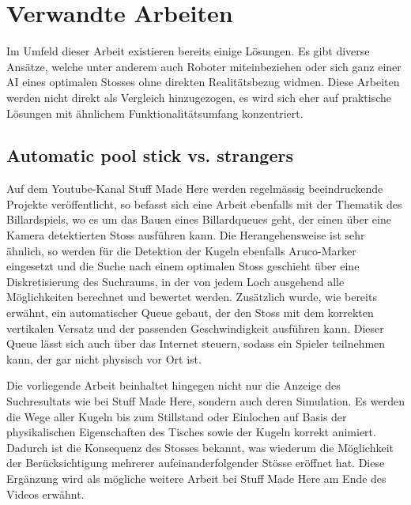 \section{Verwandte Arbeiten}\label{kap:verwandte_arbeiten}
Im Umfeld dieser Arbeit existieren bereits einige Lösungen. Es gibt diverse Ansätze, welche
unter anderem auch Roboter miteinbeziehen\cite{qucosa:ein_billardroboter:1} oder sich ganz einer AI eines
optimalen Stosses ohne direkten Realitätsbezug widmen\cite{inproceedings:billiard_ai:1}. Diese Arbeiten werden nicht
direkt als Vergleich hinzugezogen, es wird sich eher auf praktische Lösungen mit ähnlichem Funktionalitätsumfang
konzentriert.

\subsection{Automatic pool stick vs. strangers}
Auf dem Youtube-Kanal \glqq Stuff Made Here\grqq{} werden regelmässig beeindruckende Projekte veröffentlicht, so befasst
sich eine Arbeit ebenfalls mit der Thematik des Billardspiels, wo es um das Bauen eines Billardqueues geht, der einen
über eine Kamera detektierten Stoss ausführen kann\cite{stuffmadehere:automaticpoolstick}. Die Herangehensweise ist
sehr ähnlich, so werden für die Detektion der Kugeln ebenfalls Aruco-Marker eingesetzt und die Suche nach einem optimalen
Stoss geschieht über eine Diskretisierung des Suchraums, in der von jedem Loch ausgehend alle Möglichkeiten berechnet und
bewertet werden. Zusätzlich wurde, wie bereits erwähnt, ein automatischer Queue gebaut, der den Stoss mit dem korrekten
vertikalen Versatz und der passenden Geschwindigkeit ausführen kann. Dieser Queue lässt sich auch über das Internet
steuern, sodass ein Spieler teilnehmen kann, der gar nicht physisch vor Ort ist.

Die vorliegende Arbeit beinhaltet hingegen nicht nur die Anzeige des Suchresultats wie bei \glqq Stuff Made Here\grqq{},
sondern auch deren Simulation. Es werden die Wege aller Kugeln bis zum
Stillstand oder Einlochen auf Basis der physikalischen Eigenschaften des Tisches sowie der Kugeln korrekt animiert.
Dadurch ist die Konsequenz des Stosses bekannt, was wiederum die Möglichkeit der Berücksichtigung
mehrerer aufeinanderfolgender Stösse eröffnet hat.
Diese Ergänzung wird als mögliche weitere Arbeit bei \glqq Stuff Made Here\grqq{} am Ende des Videos erwähnt.

